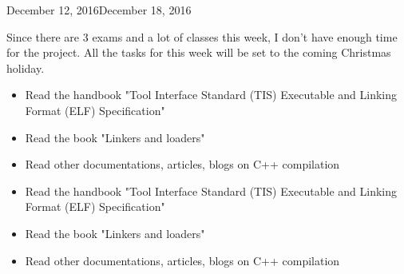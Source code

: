 \begin{fichesuivi}{December 12, 2016}{December 18, 2016}

   \begin{travaileffectue}
        Since there are 3 exams and a lot of classes this week, I don't have enough time for the project.
        All the tasks for this week will be set to the coming Christmas holiday.
   \end{travaileffectue}

   \begin{travailnoneffectue}
        \begin{itemize}
             \item Read the handbook "Tool Interface Standard (TIS)
                    Executable and Linking Format (ELF)
                    Specification"
            \item Read the book "Linkers and loaders"
            \item Read other documentations, articles, blogs on C++ compilation
        \end{itemize}
   \end{travailnoneffectue}

 
   \begin{planification}
        \begin{itemize}
            \item Read the handbook "Tool Interface Standard (TIS)
                    Executable and Linking Format (ELF)
                    Specification"
            \item Read the book "Linkers and loaders"
            \item Read other documentations, articles, blogs on C++ compilation
        \end{itemize}
   \end{planification}
\end{fichesuivi}



